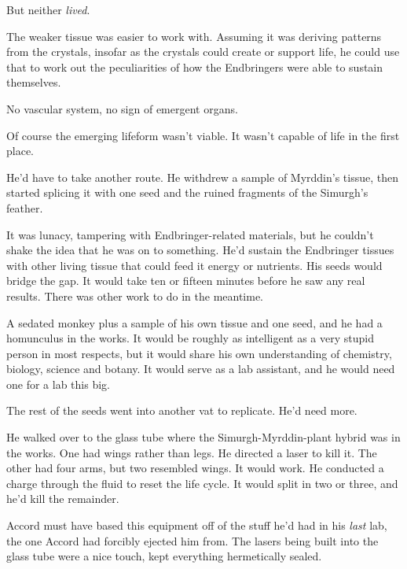 But neither \emph{lived}.



The weaker tissue was easier to work with.  Assuming it was deriving patterns from the crystals, insofar as the crystals could create or support life, he could use that to work out the peculiarities of how the Endbringers were able to sustain themselves.



No vascular system, no sign of emergent organs.



Of course the emerging lifeform wasn't viable.  It wasn't capable of life in the first place.



He'd have to take another route.  He withdrew a sample of Myrddin's tissue, then started splicing it with one seed and the ruined fragments of the Simurgh's feather.



It was lunacy, tampering with Endbringer-related materials, but he couldn't shake the idea that he was on to something.  He'd sustain the Endbringer tissues with other living tissue that could feed it energy or nutrients.  His seeds would bridge the gap.  It would take ten or fifteen minutes before he saw any real results.  There was other work to do in the meantime.



A sedated monkey plus a sample of his own tissue and one seed, and he had a homunculus in the works.  It would be roughly as intelligent as a very stupid person in most respects, but it would share his own understanding of chemistry, biology, science and botany.  It would serve as a lab assistant, and he would need one for a lab this big.



The rest of the seeds went into another vat to replicate.  He'd need more.



He walked over to the glass tube where the Simurgh-Myrddin-plant hybrid was in the works.  One had wings rather than legs.  He directed a laser to kill it.  The other had four arms, but two resembled wings.  It would work.  He conducted a charge through the fluid to reset the life cycle.  It would split in two or three, and he'd kill the remainder.



Accord must have based this equipment off of the stuff he'd had in his \emph{last} lab, the one Accord had forcibly ejected him from.  The lasers being built into the glass tube were a nice touch, kept everything hermetically sealed.



